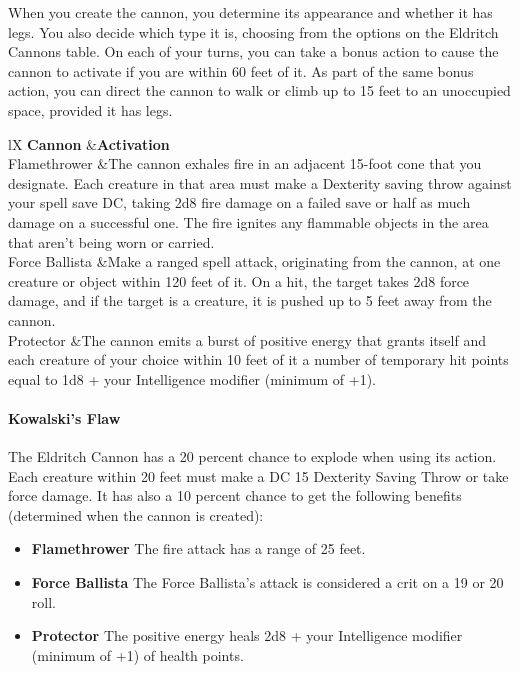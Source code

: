 {When you create the cannon, you determine its appearance and whether it has legs. You also decide which type it is, choosing from the options on the Eldritch Cannons table. On each of your turns, you can take a bonus action to cause the cannon to activate if you are within 60 feet of it. As part of the same bonus action, you can direct the cannon to walk or climb up to 15 feet to an unoccupied space, provided it has legs.
\begin{DndTable}[header=Eldritch Cannon]{lX}
\textbf{Cannon}  	&\textbf{Activation}				\\
Flamethrower		&The cannon exhales fire in an adjacent 15-foot cone that you designate. Each creature in that area must make a Dexterity saving throw against your spell save DC, taking 2d8 fire damage on a failed save or half as much damage on a successful one. The fire ignites any flammable objects in the area that aren't being worn or carried.\\
Force Ballista		&Make a ranged spell attack, originating from the cannon, at one creature or object within 120 feet of it. On a hit, the target takes 2d8 force damage, and if the target is a creature, it is pushed up to 5 feet away from the cannon.\\
Protector			&The cannon emits a burst of positive energy that grants itself and each creature of your choice within 10 feet of it a number of temporary hit points equal to 1d8 + your Intelligence modifier (minimum of +1).\\
\end{DndTable}
\paragraph*{Kowalski's Flaw}
The Eldritch Cannon has a  20 percent chance to explode when using its action. Each creature within 20 feet must make a DC 15 Dexterity Saving Throw or take  force damage. It has also a 10 percent chance to get the following  benefits (determined when the cannon is created):
\begin{itemize}
	\item \textbf{Flamethrower} The fire attack has a range of 25 feet.
	\item \textbf{Force Ballista} The Force Ballista's attack is considered a crit on a 19 or 20 roll.
	\item \textbf{Protector} The positive energy heals 2d8 + your Intelligence modifier (minimum of +1) of health points.
\end{itemize}

}
